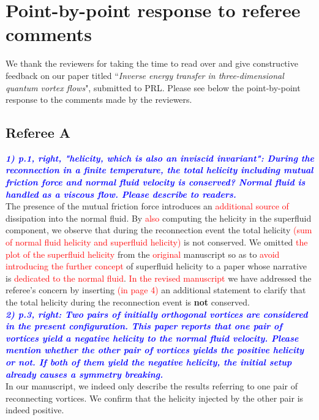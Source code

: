 \documentclass[a4paper,10pt]{article}
\def\red#1{\textcolor{red}{#1}}
\def\blue#1{\textcolor{blue}{#1}}
\def\refcomment#1{\textbf{\blue{\emph{#1}}}\\}
\begin{document}
\section*{\centering Point-by-point response to referee comments}

We thank the reviewers for taking the time to read over and give constructive feedback on our paper titled “\emph{Inverse energy transfer in three-dimensional quantum vortex flows}", submitted to PRL. Please see below the point-by-point response to the comments made by the reviewers.

\subsection*{Referee A}


    \refcomment{1) p.1, right, "helicity, which is also an inviscid invariant": During
    the reconnection in a finite temperature, the total helicity including
    mutual friction force and normal fluid velocity is conserved? Normal
    fluid is handled as a viscous flow. Please describe to readers.}

    The presence of the mutual friction force introduces an \red{additional source of} dissipation into the normal fluid. By \red{also} computing the helicity in the superfluid component, we observe that during the reconnection event
the total helicity \red{(sum of normal fluid helicity and superfluid helicity)} is not conserved. We omitted \red{the plot of the superfluid helicity}
from the \red{original} manuscript so as to \red{avoid introducing}
\red{the further concept} 
of superfluid helicity to a paper whose narrative is \red{dedicated to the
normal fluid}. \red{In the revised manuscript} we have addressed the 
referee's concern by inserting \red{(in page 4)} an additional statement 
to clarify that the total helicity during the reconnection event is 
\textbf{not} conserved. \\

    \refcomment{2) p.3, right: Two pairs of initially orthogonal vortices are
    considered in the present configuration. This paper reports that one
    pair of vortices yield a negative helicity to the normal fluid
    velocity. Please mention whether the other pair of vortices yields the
    positive helicity or not. If both of them yield the negative helicity,
    the initial setup already causes a symmetry breaking.}

    In our manuscript, we indeed only describe the results referring to one pair of reconnecting 
    vortices. We confirm that the helicity injected by the other pair is indeed positive. 
    
\end{document}
